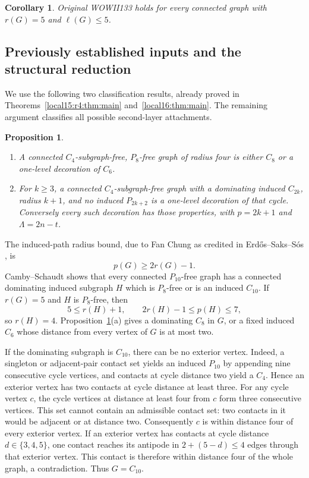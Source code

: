 \documentclass[11pt,a4paper]{article}
\newtheorem{proposition}[theorem]{Proposition}
\newtheorem{corollary}[theorem]{Corollary}
\theoremstyle{definition}\newtheorem{definition}[theorem]{Definition}
\theoremstyle{remark}\newtheorem{remark}[theorem]{Remark}
\begin{document}
\begin{corollary}\label{local18r:cor:wow}
Original WOWII133 holds for every connected graph with $r(G)=5$ and
$\ell(G)\le5$.
\end{corollary}

\subsection{Previously established inputs and the structural reduction}
We use the following two classification results, already proved in
Theorems~\ref{local15:r4:thm:main} and~\ref{local16:thm:main}. The remaining argument
classifies all possible second-layer attachments.
\begin{proposition}\label{local18r:prop:inputs}
\begin{enumerate}[label=\textup{(\alph*)}]
\item A connected $C_4$-subgraph-free, $P_8$-free graph of radius four
is either $C_8$ or a one-level decoration of $C_6$.
\item For $k\ge3$, a connected $C_4$-subgraph-free graph with a dominating
induced $C_{2k}$, radius $k+1$, and no induced $P_{2k+2}$ is a one-level
decoration of that cycle. Conversely every such decoration has those
properties, with $p=2k+1$ and $\Lambda=2n-t$.
\end{enumerate}
\end{proposition}

The induced-path radius bound, due to Fan Chung as credited in
Erd\H{o}s--Saks--S\'os \cite[Section II, pp.~64--65]{src:ess}, is
\begin{equation}\label{local18r:eq:chung}
 p(G)\ge2r(G)-1.
\end{equation}
Camby--Schaudt \cite[Theorem 5, arXiv version 1]{src:camby} shows that every
connected $P_{10}$-free graph has a connected dominating induced
subgraph $H$ which is $P_8$-free or is an induced $C_{10}$.
If $r(G)=5$ and $H$ is $P_8$-free, then
\[
 5\le r(H)+1,\qquad 2r(H)-1\le p(H)\le7,
\]
so $r(H)=4$. Proposition~\ref{local18r:prop:inputs}(a) gives a dominating $C_8$
in $G$, or a fixed induced $C_6$ whose distance from every vertex of $G$
is at most two.

If the dominating subgraph is $C_{10}$, there can be no exterior vertex.
Indeed, a singleton or adjacent-pair contact set yields an induced
$P_{10}$ by appending nine consecutive cycle vertices, and contacts at
cycle distance two yield a $C_4$. Hence an exterior vertex has two
contacts at cycle distance at least three. For any cycle vertex $c$,
the cycle vertices at distance at least four from $c$ form three
consecutive vertices. This set cannot contain an admissible contact
set: two contacts in it would be adjacent or at distance two.
Consequently $c$ is within distance four of every exterior vertex.
If an exterior vertex has contacts at cycle distance $d\in\{3,4,5\}$,
one contact reaches its antipode in
$2+(5-d)\le4$ edges through that exterior vertex. This contact is
therefore within distance four of the whole graph, a contradiction.
Thus $G=C_{10}$.
\end{document}
